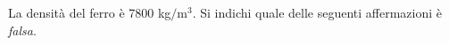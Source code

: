 La densità del ferro è 7800 kg$/$m$^3$. 
Si indichi quale delle seguenti affermazioni è \emph{falsa}.